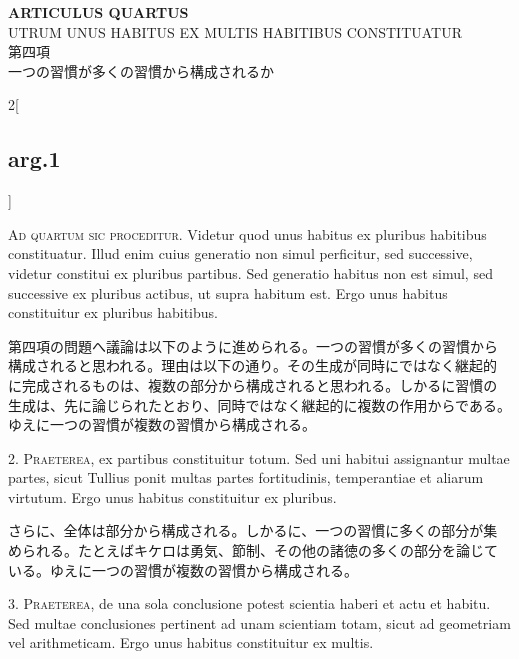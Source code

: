 \documentclass[paper=a4paper,fontsize=10pt,jafontsize=9pt,titlepage]{jlreq}
\begin{document}
\begin{center}
{\Large {\bfseries ARTICULUS QUARTUS}}\\
{\large UTRUM UNUS HABITUS EX MULTIS HABITIBUS CONSTITUATUR}\\
{\Large 第四項\\一つの習慣が多くの習慣から構成されるか}
\end{center}

\begin{paracol}{2}[\subsection{arg.1}]

{\scshape Ad quartum sic proceditur}. Videtur quod unus habitus ex
pluribus habitibus constituatur. Illud enim cuius generatio non simul
perficitur, sed successive, videtur constitui ex pluribus
partibus. Sed generatio habitus non est simul, sed successive ex
pluribus actibus, ut supra habitum est. Ergo unus habitus constituitur
ex pluribus habitibus.

\switchcolumn

第四項の問題へ議論は以下のように進められる。一つの習慣が多くの習慣から
構成されると思われる。理由は以下の通り。その生成が同時にではなく継起的
に完成されるものは、複数の部分から構成されると思われる。しかるに習慣の
生成は、先に論じられたとおり、同時ではなく継起的に複数の作用からである。
ゆえに一つの習慣が複数の習慣から構成される。


2. {\scshape Praeterea}, ex partibus constituitur totum. Sed uni
habitui assignantur multae partes, sicut Tullius ponit multas partes
fortitudinis, temperantiae et aliarum virtutum. Ergo unus habitus
constituitur ex pluribus.

\switchcolumn

さらに、全体は部分から構成される。しかるに、一つの習慣に多くの部分が集
められる。たとえばキケロは勇気、節制、その他の諸徳の多くの部分を論じて
いる。ゆえに一つの習慣が複数の習慣から構成される。


3. {\scshape Praeterea}, de una sola conclusione potest scientia
haberi et actu et habitu. Sed multae conclusiones pertinent ad unam
scientiam totam, sicut ad geometriam vel arithmeticam. Ergo unus
habitus constituitur ex multis.


\end{paracol}
\end{document}

